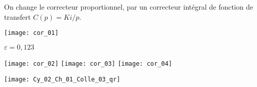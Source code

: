 On change le correcteur proportionnel, par un correcteur intégral de fonction de transfert $C(p)=Ki/p$.
\ifprof
\begin{corrige}
\end{corrige}
\else
\fi



\ifprof


\begin{center}
	\texttt{[image: cor\_01]}
	
	$\varepsilon = 0,123$
	
	\texttt{[image: cor\_02]}
	\texttt{[image: cor\_03]}
	\texttt{[image: cor\_04]}
\end{center}



%
\else
\fi



\ifprof
\else
\begin{marginfigure}[-3cm]
\centering
\texttt{[image: Cy\_02\_Ch\_01\_Colle\_03\_qr]}
\end{marginfigure}
\fi
